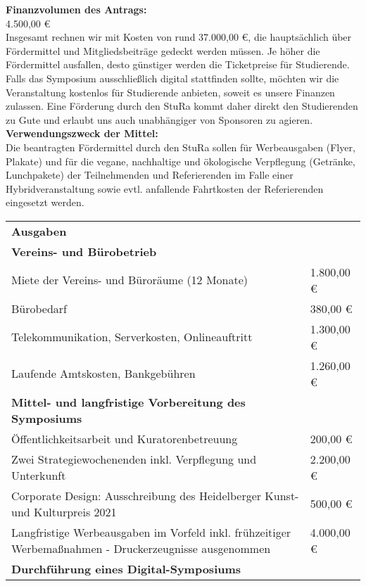 {    \textbf{Finanzvolumen des Antrags:}\\
    4.500,00 €\\
    Insgesamt rechnen wir mit Kosten von rund 37.000,00 €, die hauptsächlich über Fördermittel und Mitgliedsbeiträge gedeckt werden müssen. Je höher die Fördermittel ausfallen, desto günstiger werden die Ticketpreise für Studierende. Falls das Symposium ausschließlich digital stattfinden sollte, möchten wir die Veranstaltung kostenlos für Studierende anbieten, soweit es unsere Finanzen zulassen. Eine Förderung durch den StuRa kommt daher direkt den Studierenden zu Gute und erlaubt uns auch unabhängiger von Sponsoren zu agieren.\\[1em]
    \textbf{Verwendungszweck der Mittel:}\\
    Die beantragten Fördermittel durch den StuRa sollen für Werbeausgaben (Flyer, Plakate) und für die vegane, nachhaltige und ökologische Verpflegung (Getränke, Lunchpakete) der Teilnehmenden und Referierenden im Falle einer Hybridveranstaltung sowie evtl. anfallende Fahrtkosten der Referierenden eingesetzt werden.\\
    \begin{longtable}{p{12cm} p{3cm}}
        \endfirsthead
        \endhead
        \endfoot
        \endlastfoot
        \textbf{Ausgaben} & \\
        \textbf{Vereins- und Bürobetrieb} & \\
        Miete der Vereins- und Büroräume (12 Monate) & 1.800,00 € \\
        Bürobedarf & 380,00 € \\
        Telekommunikation, Serverkosten, Onlineauftritt & 1.300,00 € \\
        Laufende Amtskosten, Bankgebühren & 1.260,00 € \\
        \textbf{Mittel- und langfristige Vorbereitung des Symposiums} & \\
        Öffentlichkeitsarbeit und Kuratorenbetreuung & 200,00 € \\
        Zwei Strategiewochenenden inkl. Verpflegung und Unterkunft & 2.200,00 €\\
        Corporate Design: Ausschreibung des Heidelberger Kunst- und Kulturpreis 2021 & 500,00 €\\
        Langfristige Werbeausgaben im Vorfeld inkl. frühzeitiger Werbemaßnahmen - Druckerzeugnisse ausgenommen & 4.000,00 €\\
        \textbf{Durchführung eines Digital-Symposiums} & \\

\end{longtable}}
